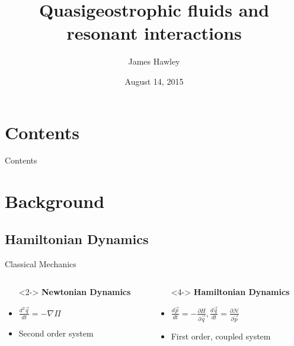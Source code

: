 \documentclass{beamer}
\title{Quasigeostrophic fluids and resonant interactions}
\author{James Hawley}
\date{August 14, 2015}
\institute{University of Waterloo}
\begin{document}
	\begin{frame}
		\titlepage
	\end{frame}

	\section*{Contents}
		\begin{frame}{Contents}
			\tableofcontents
		\end{frame}

	\section{Background}
		\subsection{Hamiltonian Dynamics}
			\begin{frame}[t]{Classical Mechanics}
				\begin{columns}
					\begin{column}{0.5\textwidth}
						\begin{itemize}
							\item[]<2-> \textbf{Newtonian Dynamics}
							\item<3-> $\frac{d^2 \vec q}{dt} = -\nabla \Pi$
							\item<3-> Second order system
						\end{itemize}
					\end{column}
					\begin{column}{0.5\textwidth}
						\begin{itemize}
							\item[]<4-> \textbf{Hamiltonian Dynamics}
							\item<5-> $\frac{d \vec p}{dt} = -\frac{\partial H}{\partial \vec q}, \frac{d \vec q}{dt} = \frac{\partial \mathcal{H}}{\partial \vec p}$
							\item<5-> First order, coupled system
						\end{itemize}
					\end{column}
				\end{columns}
			\end{frame}
\end{document}
